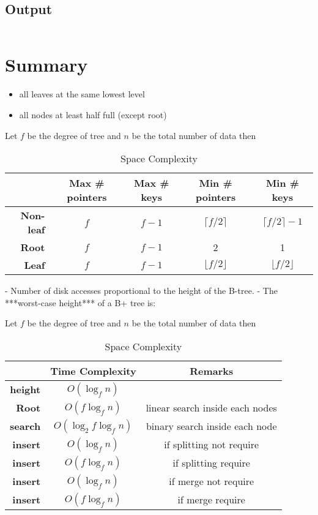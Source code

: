 \documentclass[paper=letter, fontsize=12pt]{article}
\begin{document}
\subsection*{Output}
\inputminted[frame=lines, breaklines]{text}{../bplus.out}

\section{Summary}
\begin{itemize}
	\item all leaves at the same lowest level
	\item all nodes at least half full (except root)
\end{itemize}

\begin{table}[H]
	Let $f$ be the degree of tree and $n$ be the total number of data then
	\centering
	\caption*{Space Complexity}
	\begin{tabular}{r | c | c | c | c}
		& \textbf{Max \# pointers} & \textbf{Max \# keys} & \textbf{Min \# pointers} & \textbf{Min \# keys} \\
		\hline
		\hline
		\textbf{Non-leaf} & $f$ & $f - 1$ & $\lceil f/2 \rceil$ & $\lceil f/2 \rceil - 1$ \\
		\textbf{Root} & $f$ & $f - 1$ & 2 & 1 \\
		\textbf{Leaf} & $f$ & $f - 1$ & $\lfloor f/2 \rfloor$ & $\lfloor f/2 \rfloor$ \\
	\end{tabular}
\end{table}


- Number of disk accesses proportional to the height of the B-tree.
- The ***worst-case height*** of a B+ tree is:

\begin{table}[H]
	Let $f$ be the degree of tree and $n$ be the total number of data then
	\centering
	\caption*{Space Complexity}
	\begin{tabular}{r | c | c }
		& \textbf{Time Complexity} & \textbf{Remarks} \\
		\hline
		\hline
		\textbf{height} & $O(\log_fn)$ & \\
		\textbf{Root} & $O(f\log_fn)$ & linear search inside each nodes \\
		\textbf{search} & $O(\log_2f\log_fn)$  & binary search inside each node \\
		\textbf{insert} & $O(\log_fn)$ & if splitting not require \\
		\textbf{insert} & $O(f\log_fn)$  & if splitting require \\
		\textbf{insert} &  $O(\log_fn)$  & if merge not require  \\
		\textbf{insert} &  $O(f\log_fn)$  & if merge require \\
	\end{tabular}
\end{table}
\end{document}
